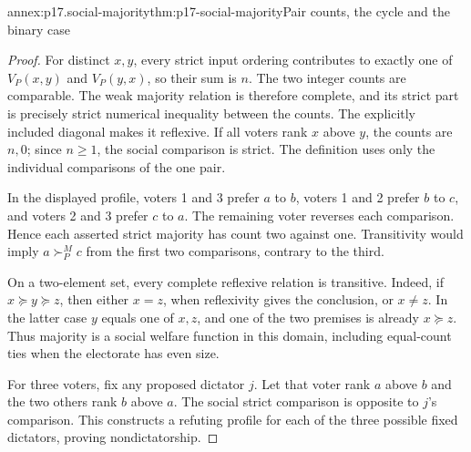 
\begin{annexitem}{annex:p17.social-majority}{thm:p17-social-majority}{Pair counts, the cycle and the binary case}
\begin{proof}
For distinct \(x,y\), every strict input ordering contributes to exactly
one of \(V_P(x,y)\) and \(V_P(y,x)\), so their sum is \(n\).
The two integer counts are comparable. The weak majority relation is
therefore complete, and its strict part is precisely strict numerical
inequality between the counts. The explicitly included diagonal makes it
reflexive. If all voters rank \(x\) above \(y\), the counts are \(n,0\);
since \(n\geq1\), the social comparison is strict. The definition uses only
the individual comparisons of the one pair.

In the displayed profile, voters 1 and 3 prefer \(a\) to \(b\),
voters 1 and 2 prefer \(b\) to \(c\), and voters 2 and 3 prefer \(c\) to
\(a\). The remaining voter reverses each comparison. Hence each asserted
strict majority has count two against one. Transitivity would imply
\(a\succ^M_Pc\) from the first two comparisons, contrary to the third.

On a two-element set, every complete reflexive relation is transitive.
Indeed, if \(x\succeq y\succeq z\), then either \(x=z\), when reflexivity
gives the conclusion, or \(x\ne z\). In the latter case \(y\) equals
one of \(x,z\), and one of the two premises is already \(x\succeq z\).
Thus majority is a social welfare function in this domain, including
equal-count ties when the electorate has even size.

For three voters, fix any proposed dictator \(j\). Let that voter rank
\(a\) above \(b\) and the two others rank \(b\) above \(a\).
The social strict comparison is opposite to \(j\)'s comparison.
This constructs a refuting profile for each of the three possible fixed
dictators, proving nondictatorship.
\end{proof}
\end{annexitem}

